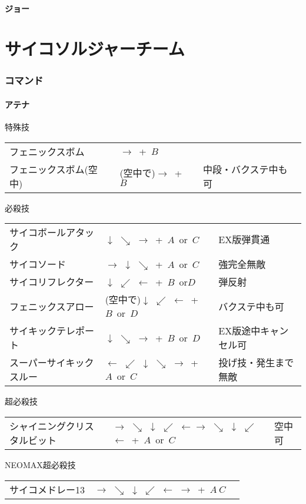 \documentclass[a4j,11pt]{jarticle}
\def\hado{$\downarrow$ $\searrow$ $\rightarrow$}%
\def\tatsu{$\downarrow$ $\swarrow$ $\leftarrow$}%
\def\syoryu{$\rightarrow$ $\downarrow$ $\searrow$}%
\def\yoga{$\leftarrow$ $\swarrow$ $\downarrow$ $\searrow$ $\rightarrow$}%
\def\gyakuyoga{$\rightarrow$ $\searrow$ $\downarrow$ $\swarrow$ $\leftarrow$}%
\def\tenti{$\rightarrow$ $\searrow$ $\downarrow$ $\swarrow$ $\leftarrow$ $\rightarrow$}%
\begin{document}
\subsection{ジョー}
\newpage
\part{サイコソルジャーチーム}
\section{コマンド}
\subsection{アテナ}
\begin{itembox}[l]{特殊技}
\begin{tabular}{lll}
フェニックスボム&$\rightarrow$\ +\ $B$&\\
フェニックスボム(空中)&(空中で)$\rightarrow$\ +\ $B$&中段・バクステ中も可
\end{tabular}
\end{itembox}
\begin{itembox}[l]{必殺技}
\begin{tabular}{lll}
サイコボールアタック&\hado\ +\ $A$\ or\ $C$&EX版弾貫通\\
サイコソード&\syoryu\ +\ $A$\ or\ $C$&強完全無敵\\
サイコリフレクター&\tatsu\ +\ $B$\ or$D$&弾反射\\
フェニックスアロー&(空中で)\tatsu\ +\ $B$\ or\ $D$&バクステ中も可\\
サイキックテレポート&\hado\ +\ $B$\ or\ $D$&EX版途中キャンセル可\\
スーパーサイキックスルー&\yoga\ +\ $A$\ or\ $C$&投げ技・発生まで無敵
\end{tabular}
\end{itembox}
\begin{itembox}[l]{超必殺技}
\begin{tabular}{lll}
シャイニングクリスタルビット&\gyakuyoga\gyakuyoga\ +\ $A$\ or\ $C$&空中可
\end{tabular}
\end{itembox}
\begin{itembox}[l]{NEOMAX超必殺技}
\begin{tabular}{lll}
サイコメドレー13&\tenti\ +\ $A\ C$&
\end{tabular}
\end{itembox}
\newpage
\end{document}
